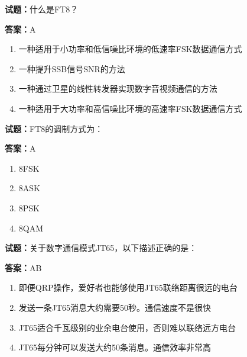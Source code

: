 \documentclass{ctexbook}
\begin{document}




\vspace{1em}

\textbf{试题：}什么是FT8？ 


\textbf{答案：}A 

\begin{enumerate}[leftmargin=3em]
  \item 一种适用于小功率和低信噪比环境的低速率FSK数据通信方式 

  \item 一种提升SSB信号SNR的方法 

  \item 一种通过卫星的线性转发器实现数字音视频通信的方法 

  \item 一种适用于大功率和高信噪比环境的高速率FSK数据通信方式 

\end{enumerate}





\vspace{1em}

\textbf{试题：}FT8的调制方式为： 

\textbf{答案：}A 

\begin{enumerate}[leftmargin=3em]
  \item 8FSK 

  \item 8ASK 

  \item 8PSK 

  \item 8QAM 

\end{enumerate}





\vspace{1em}

\textbf{试题：}关于数字通信模式JT65，以下描述正确的是： 

\textbf{答案：}AB 

\begin{enumerate}[leftmargin=3em]
  \item 即便QRP操作，爱好者也能够使用JT65联络距离很远的电台 

  \item 发送一条JT65消息大约需要50秒。通信速度不是很快 

  \item JT65适合千瓦级别的业余电台使用，否则难以联络远方电台 

  \item JT65每分钟可以发送大约50条消息。通信效率非常高 

\end{enumerate}
\end{document}
